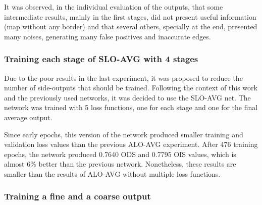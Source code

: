 It was observed, in the individual evaluation of the outputs, that some intermediate results, mainly in the first stages, did not present useful information (map without any border) and that several others, specially at the end, presented many noises, generating many false positives and inaccurate edges.




\subsubsection{Training each stage of SLO-AVG with 4 stages}
\label{sssec:train_stage_slo_avg}

Due to the poor results in the last experiment, it was proposed to reduce the number of side-outputs that should be trained.
Following the context of this work and the previously used networks, it was decided to use the SLO-AVG net.
The network was trained with 5 loss functions, one for each stage and one for the final average output.

Since early epochs, this version of the network produced smaller training and validation loss values than the previous ALO-AVG experiment.
After 476 training epochs, the network produced 0.7640 ODS and 0.7795 OIS values, which is almost 6\% better than the previous network.
Nonetheless, these results are smaller than the results of ALO-AVG without multiple loss functions.

\subsubsection{Training a fine and a coarse output}
\label{sssec:train_alo_plus}

